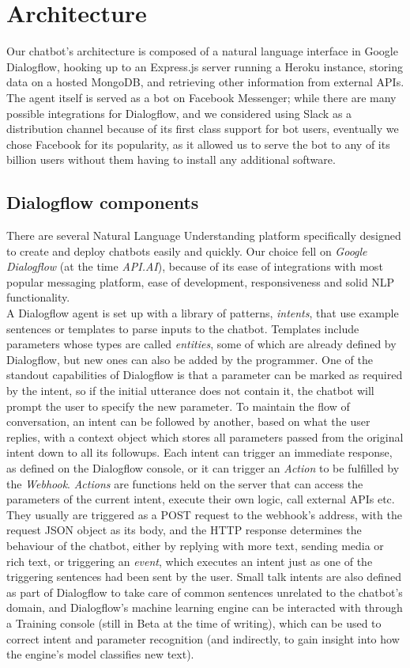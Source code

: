 \section{Architecture}
Our chatbot's architecture is composed of a natural language interface in Google Dialogflow, hooking up to an Express.js server running a Heroku instance, storing data on a hosted MongoDB, and retrieving other information from external APIs. The agent itself is served as a bot on Facebook Messenger; while there are many possible integrations for Dialogflow, and we considered using Slack as a distribution channel because of its first class support for bot users, eventually we chose Facebook for its popularity, as it allowed us to serve the bot to any of its billion users without them having to install any additional software.
\subsection{Dialogflow components}
There are several Natural Language Understanding platform specifically designed to create and deploy chatbots easily and quickly. Our choice fell on \textit{Google Dialogflow} (at the time \textit{API.AI}), because of its ease of integrations with most popular messaging platform, ease of development, responsiveness and solid NLP functionality. \\
A Dialogflow agent is set up with a library of patterns, \textit{intents}, that use example sentences or templates to parse inputs to the chatbot. Templates include parameters whose types are called \textit{entities}, some of which are already defined by Dialogflow, but new ones can also be added by the programmer. One of the standout capabilities of Dialogflow is that a parameter can be marked as required by the intent, so if the initial utterance does not contain it, the chatbot will prompt the user to specify the new parameter. To maintain the flow of conversation, an intent can be followed by another, based on what the user replies, with a context object which stores all parameters passed from the original intent down to all its followups. Each intent can trigger an immediate response, as defined on the Dialogflow console, or it can trigger an \textit{Action} to be fulfilled by the \textit{Webhook}. \textit{Actions} are functions held on the server that can access the parameters of the current intent, execute their own logic, call external APIs etc. They usually are triggered as a POST request to the webhook's address, with the request JSON object as its body, and the HTTP response determines the behaviour of the chatbot, either by replying with more text, sending media or rich text, or triggering an \textit{event}, which executes an intent just as one of the triggering sentences had been sent by the user. Small talk intents are also defined as part of Dialogflow to take care of common sentences unrelated to the chatbot's domain, and Dialogflow's machine learning engine can be interacted with through a Training console (still in Beta at the time of writing), which can be used to correct intent and parameter recognition (and indirectly, to gain insight into how the engine's model classifies new text).

